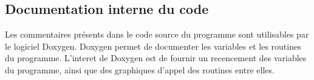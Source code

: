 \subsection{Documentation interne du code}
Les commentaires présents dans le code source du programme sont utilisables par le logiciel Doxygen.
Doxygen permet de documenter les variables et les routines du programme.
L'interet de Doxygen est de fournir un recencement des variables du programme, ainsi que des graphiques d'appel des routines entre elles.

\FloatBarrier

